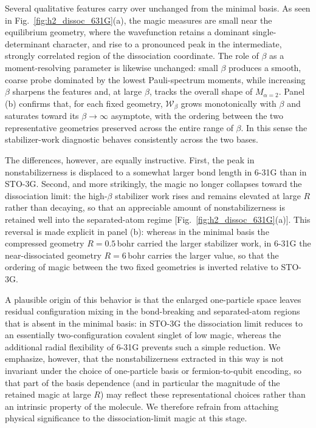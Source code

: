 \documentclass[aps,pra,superscriptaddress,twocolumn,longbibliography]{revtex4-2}
\newcommand{\figref}[1]{Fig.~\ref{#1}}
\begin{document}
Several qualitative features carry over unchanged from the minimal basis. As seen in \figref{fig:h2_dissoc_631G}(a), the magic measures are small near the equilibrium geometry, where the wavefunction retains a dominant single-determinant character, and rise to a pronounced peak in the intermediate, strongly correlated region of the dissociation coordinate. The role of $\beta$ as a moment-resolving parameter is likewise unchanged: small $\beta$ produces a smooth, coarse probe dominated by the lowest Pauli-spectrum moments, while increasing $\beta$ sharpens the features and, at large $\beta$, tracks the overall shape of $M_{\alpha=2}$. Panel (b) confirms that, for each fixed geometry, $\mathcal{W}_{\beta}$ grows monotonically with $\beta$ and saturates toward its $\beta\to\infty$ asymptote, with the ordering between the two representative geometries preserved across the entire range of $\beta$. In this sense the stabilizer-work diagnostic behaves consistently across the two bases.

The differences, however, are equally instructive. First, the peak in nonstabilizerness is displaced to a somewhat larger bond length in 6-31G than in STO-3G. Second, and more strikingly, the magic no longer collapses toward the dissociation limit: the high-$\beta$ stabilizer work rises and remains elevated at large $R$ rather than decaying, so that an appreciable amount of nonstabilizerness is retained well into the separated-atom regime [\figref{fig:h2_dissoc_631G}(a)]. This reversal is made explicit in panel (b): whereas in the minimal basis the compressed geometry $R=0.5$\,bohr carried the larger stabilizer work, in 6-31G the near-dissociated geometry $R=6$\,bohr carries the larger value, so that the ordering of magic between the two fixed geometries is inverted relative to STO-3G.

A plausible origin of this behavior is that the enlarged one-particle space leaves residual configuration mixing in the bond-breaking and separated-atom regions that is absent in the minimal basis: in STO-3G the dissociation limit reduces to an essentially two-configuration covalent singlet of low magic, whereas the additional radial flexibility of 6-31G prevents such a simple reduction. We emphasize, however, that the nonstabilizerness extracted in this way is not invariant under the choice of one-particle basis or fermion-to-qubit encoding, so that part of the basis dependence (and in particular the magnitude of the retained magic at large $R$) may reflect these representational choices rather than an intrinsic property of the molecule. We therefore refrain from attaching physical significance to the dissociation-limit magic at this stage.
\end{document}
